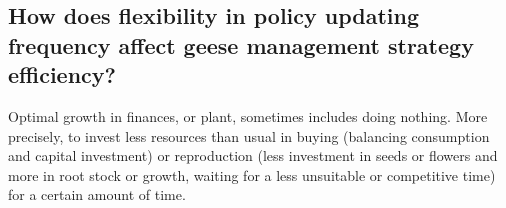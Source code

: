 \documentclass[12pt,a4paper]{article}
\begin{document}
\subsection{How does flexibility in policy updating frequency affect geese management strategy efficiency?}
Optimal growth in finances, or plant, sometimes includes doing nothing. %
More precisely, to invest less resources than usual in buying (balancing consumption and capital investment) or reproduction (less investment in seeds or flowers and more in root stock or growth, waiting for a less unsuitable or competitive time) for a certain amount of time. %
\end{document}
